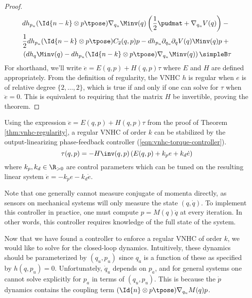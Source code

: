 \begin{proof}
\begin{align*}
     & dh_{p_u}(\Id{n-k}\otimes p\tpose)\nabla_{q_u}\Minv(q)\left(
     \frac{1}{2}\pudmat + \nabla_{q_u}V(q)\right) -{}\\
     & \frac{1}{2}dh_{p_u}(\Id{n-k}\otimes p\tpose)C_2(q,p)p - 
     dh_{p_u} \partial_{q_u}\partial_q V(q)\Minv(q)p +{} \\
     & \left(dh_q \Minv(q) - dh_{p_u}(\Id{n-k} \otimes
     p\tpose)\nabla_{q_u}\Minv(q) \right) \simpleB \tau
    \end{align*}
    For shorthand, we'll write \(\ddot{e} = E(q,p) + H(q,p)\tau\) where \(E\)
    and \(H\) are defined appropriately.
    From the definition of regularity, the VNHC \(h\) is regular 
    when \(e\) is of relative degree \(\{2,\ldots,2\}\), which is true 
    if and only if
    one can solve for \(\tau\) when \(\ddot{e} = 0\).
    This is equivalent to requiring that the matrix \(H\) be
    invertible,
    proving the theorem.
\end{proof}

Using the expression \(\ddot{e} = E(q,p) + H(q,p)\tau\) from the proof of 
Theorem \ref{thm:vnhc-regularity}, a regular VNHC of order \(k\) can be
stabilized by the output-linearizing phase-feedback controller
(\ref{eqn:vnhc-torque-controller}).
\begin{equation}\label{eqn:vnhc-torque-controller}
    \tau(q,p) = -H\inv(q,p)\left(E(q,p) + k_p e + k_d \dot{e}\right)
\end{equation}
where \(k_p, k_d \in \R_{>0}\) are control parameters which can be tuned on the
resulting linear system \(\ddot{e} = -k_p e - k_d\dot{e}\). 

Note that one generally cannot measure conjugate of momenta directly, as sensors
on mechanical systems will only measure the state \((q,\dot{q})\). To
implement this controller in practice, one must compute \(p = M(q)\dot{q}\) at
every iteration. In other words, this controller requires knowledge of the full
state of the system.


Now that we have found a controller to enforce a regular VNHC of order \(k\), we
would like to solve for the closed-loop dynamics. Intuitively, these dynamics
should be parameterized by \((q_u, p_u)\) since \(q_a\) is a function of these
as specified by \(h(q,p_u) = 0\).
Unfortunately, \(\dot{q}_u\) depends on \(p_a\), and for general systems one
cannot solve explicitly for \(p_a\) in terms of \((q_u,p_u)\). This is because
the \(\dot{p}\) dynamics contains the coupling term 
\((\Id{n} \otimes p\tpose)\nabla_{q_u}M(q)p\). 

